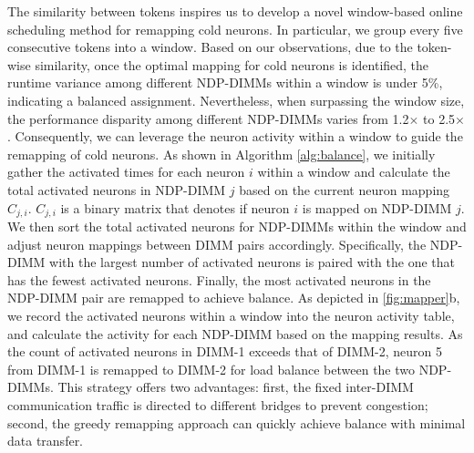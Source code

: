 The similarity between tokens inspires us to develop a novel window-based online scheduling method for remapping cold neurons. In particular, we group every five consecutive tokens into a window. Based on our observations, due to the token-wise similarity, once the optimal mapping for cold neurons is identified, the runtime variance among different NDP-DIMMs within a window is under 5\%, indicating a balanced assignment. Nevertheless, when surpassing the window size, the performance disparity among different NDP-DIMMs varies from 1.2$\times$ to 2.5$\times$. Consequently, we can leverage the neuron activity within a window to guide the remapping of cold neurons. As shown in Algorithm \ref{alg:balance}, we initially gather the activated times for each neuron $i$ within a window and calculate the total activated neurons in NDP-DIMM $j$ based on the current neuron mapping $C_{j,i}$. $C_{j,i}$ is a binary matrix that denotes if neuron $i$ is mapped on NDP-DIMM $j$. We then sort the total activated neurons for NDP-DIMMs within the window and adjust neuron mappings between DIMM pairs accordingly. Specifically, the NDP-DIMM with the largest number of activated neurons is paired with the one that has the fewest activated neurons. Finally, the most activated neurons in the NDP-DIMM pair are remapped to achieve balance. As depicted in \fig \ref{fig:mapper}b, we record the activated neurons within a window into the neuron activity table, and calculate the activity for each NDP-DIMM based on the mapping results. As the count of activated neurons in DIMM-1 exceeds that of DIMM-2, neuron 5 from DIMM-1 is remapped to DIMM-2 for load balance between the two NDP-DIMMs. This strategy offers two advantages: first, the fixed inter-DIMM communication traffic is directed to different bridges to prevent congestion; second, the greedy remapping approach can quickly achieve balance with minimal data transfer.
